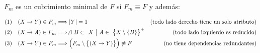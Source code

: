 \documentclass[preview]{standalone}
\begin{document}
$F_m$ es un cubrimiento minimal de $F$ si $F_m\equiv F$ y adem\'as:

\begin{align*}
(1)\quad  & (X\rightarrow Y) \in F_m \Longrightarrow |Y| = 1& \text{(todo lado derecho tiene un solo atributo)}\\
(2)\quad  & (X\rightarrow A) \in F_m \Longrightarrow \not \exists \ B \subset \ X \ \big| \  A\in \  \big\{ X \setminus \{B\} \big\}^+ & \text{(todo lado izquierdo es reducido)}\\
(3)\quad  & (X\rightarrow Y) \in F_m \Longrightarrow \Big(F_m\setminus\big\{(X\rightarrow Y)\big\}\Big)\not\equiv F & \text{(no tiene dependencias redundantes)}\\
\end{align*}
\end{document}
